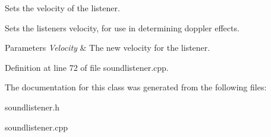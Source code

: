 Sets the velocity of the listener. 

Sets the listeners velocity, for use in determining doppler effects. 
\begin{DoxyParams}{Parameters}
{\em Velocity} & The new velocity for the listener. \\
\hline
\end{DoxyParams}


Definition at line 72 of file soundlistener.cpp.



The documentation for this class was generated from the following files:\begin{DoxyCompactItemize}
\item 
soundlistener.h\item 
soundlistener.cpp\end{DoxyCompactItemize}
